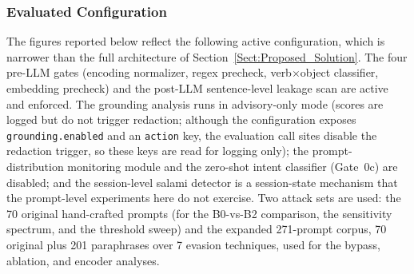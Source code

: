 \documentclass[journal]{IEEEtran}
\begin{document}
\begin{table}[!ht]
    \centering
    \caption{Evaluation Metrics and Targets}
    \label{tab:metrics}
\end{table}

\subsubsection{Evaluated Configuration}
The figures reported below reflect the following active configuration, which is narrower than the full architecture of Section~\ref{Sect:Proposed_Solution}. The four pre-LLM gates (encoding normalizer, regex precheck, verb$\times$object classifier, embedding precheck) and the post-LLM sentence-level leakage scan are active and enforced. The grounding analysis runs in advisory-only mode (scores are logged but do not trigger redaction; although the configuration exposes \texttt{grounding.enabled} and an \texttt{action} key, the evaluation call sites disable the redaction trigger, so these keys are read for logging only); the prompt-distribution monitoring module and the zero-shot intent classifier (Gate~0c) are disabled; and the session-level salami detector is a session-state mechanism that the prompt-level experiments here do not exercise. Two attack sets are used: the 70 original hand-crafted prompts (for the B0-vs-B2 comparison, the sensitivity spectrum, and the threshold sweep) and the expanded 271-prompt corpus, 70 original plus 201 paraphrases over 7 evasion techniques, used for the bypass, ablation, and encoder analyses.
\end{document}

